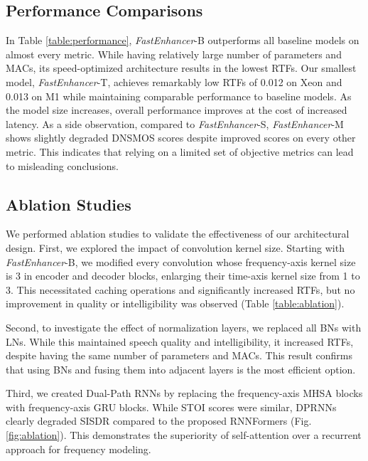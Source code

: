 \subsection{Performance Comparisons}
\label{sec:performance}
In Table \ref{table:performance}, \textit{FastEnhancer}-B outperforms all baseline models on almost every metric. While having relatively large number of parameters and MACs, its speed-optimized architecture results in the lowest RTFs. Our smallest model, \textit{FastEnhancer}-T, achieves remarkably low RTFs of 0.012 on Xeon and 0.013 on M1 while maintaining comparable performance to baseline models. As the model size increases, overall performance improves at the cost of increased latency. As a side observation, compared to \textit{FastEnhancer}-S, \textit{FastEnhancer}-M shows slightly degraded DNSMOS scores despite improved scores on every other metric. This indicates that relying on a limited set of objective metrics can lead to misleading conclusions.

\subsection{Ablation Studies}
\label{sec:ablation}
We performed ablation studies to validate the effectiveness of our architectural design. First, we explored the impact of convolution kernel size. Starting with \textit{FastEnhancer}-B, we modified every convolution whose frequency-axis kernel size is 3 in encoder and decoder blocks, enlarging their time-axis kernel size from 1 to 3.
This necessitated caching operations and significantly increased RTFs, but no improvement in quality or intelligibility was observed (Table \ref{table:ablation}).

Second, to investigate the effect of normalization layers, we replaced all BNs with LNs. While this maintained speech quality and intelligibility, it increased RTFs, despite having the same number of parameters and MACs. This result confirms that using BNs and fusing them into adjacent layers is the most efficient option.

Third, we created Dual-Path RNNs by replacing the frequency-axis MHSA blocks with frequency-axis GRU blocks.
While STOI scores were similar, DPRNNs clearly degraded SISDR compared to the proposed RNNFormers (Fig. \ref{fig:ablation}).
This demonstrates the superiority of self-attention over a recurrent approach for frequency modeling.

